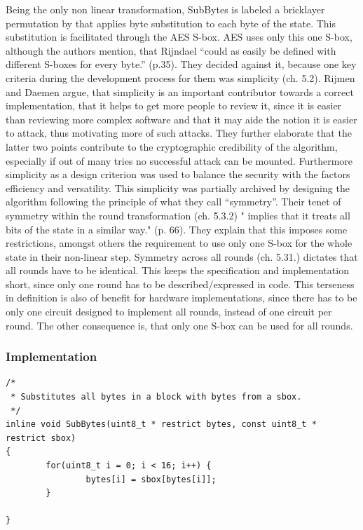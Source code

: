 Being the only non linear transformation, SubBytes is labeled a
bricklayer permutation by \cite[p. 34]{rijndael} that applies byte substitution to
each byte of the state. This substitution is facilitated through the
AES S-box. AES uses
only this one S-box, although the authors mention, that Rijndael ``could
as easily be defined with different S-boxes for every byte.'' (p.35).
They decided against it, because one key criteria during the
development process for them was simplicity (ch. 5.2). Rijmen and
Daemen argue, that simplicity is an important contributor towards a
correct implementation, that it helps to get more people to review it,
since it is easier than reviewing more complex software and that it may
aide the notion it is easier to attack, thus motivating more of such
attacks. They further elaborate that the latter two points contribute to
the cryptographic credibility of the algorithm, especially if out of
many tries no successful attack can be mounted. Furthermore simplicity as
a design criterion was used to balance the security with the factors
efficiency and versatility. This simplicity was partially archived by
designing the algorithm following the principle of what they call
``symmetry''. Their tenet of symmetry within the round transformation
(ch. 5.3.2) " implies that it treats all bits of the state in a similar
way." (p. 66). They explain that this imposes some restrictions, amongst
others the requirement to use only one S-box for the whole state in their
non-linear step. Symmetry across all rounds (ch. 5.31.) dictates that
all rounds have to be identical. This keeps the specification and
implementation short, since only one round has to be described/expressed
in code. This terseness in definition is also of benefit for hardware
implementations, since there has to be only one circuit designed to
implement all rounds, instead of one circuit per round. The other consequence is,
that only one S-box can be used for all rounds.

\hypertarget{implementation-4}{%
\subsubsection{Implementation}\label{implementation-4}}

\begin{lstlisting}
/*
 * Substitutes all bytes in a block with bytes from a sbox.
 */
inline void SubBytes(uint8_t * restrict bytes, const uint8_t * restrict sbox)
{
        for(uint8_t i = 0; i < 16; i++) {
                bytes[i] = sbox[bytes[i]];
        }

}
\end{lstlisting}

